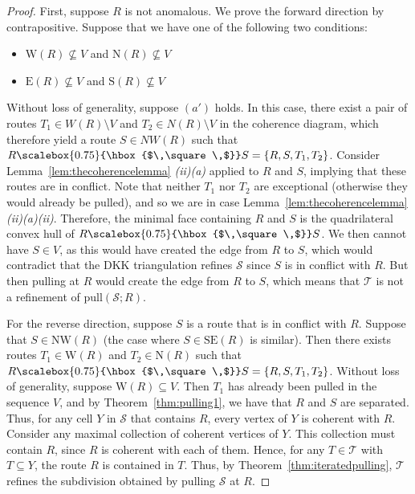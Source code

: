 \documentclass[12pt]{amsart}
\theoremstyle{definition}
\newcommand\calS{\mathcal{S}}
\newcommand\calT{\mathcal{T}}
\newcommand\pull{\mathrm{pull}}
\newcommand\north{\mathrm{N}}
\newcommand\south{\mathrm{S}}
\newcommand\east{\mathrm{E}}
\newcommand\west{\mathrm{W}}
\newcommand\NW{\mathrm{NW}}
\newcommand\SE{\mathrm{SE}}
\newcommand\squarette{\scalebox{0.75}{\hbox{$\,\square\,$}}}
\begin{document}
\begin{proof}
    First, suppose $R$ is not anomalous.
    We prove the forward direction by contrapositive.
    Suppose that we have one of the following two conditions:
    \begin{itemize}
         \item[$a')$] $\west(R)\nsubseteq V$ and $\north(R)\nsubseteq V$
         \item[$b')$] $\east(R)\nsubseteq V$ and $\south(R)\nsubseteq V$
     \end{itemize}
     Without loss of generality, suppose $(a')$ holds.
     In this case, there exist a pair of routes $T_1\in W(R)\setminus V$ and $T_2\in N(R) \setminus V$ in the coherence diagram, which therefore yield a route $S\in NW(R)$ such that $R\squarette S=\{R,S,T_1,T_2\}$.
     Consider Lemma~\ref{lem:thecoherencelemma} \textit{(ii)(a)} applied to $R$ and $S$, implying that these routes are in conflict. Note that neither $T_1$ nor $T_2$ are exceptional (otherwise they would already be pulled), and so we are in case Lemma~\ref{lem:thecoherencelemma} \textit{(ii)(a)(ii)}. Therefore, the minimal face containing $R$ and $S$ is the quadrilateral convex hull of $R\squarette S$. We then cannot have $S\in V$, as this would have created the edge from $R$ to $S$, which would contradict that the DKK triangulation refines $\calS$ since $S$ is in conflict with $R$.
     But then pulling at $R$ would create the edge from $R$ to $S$, which means that $\calT$ is not a refinement of $\pull(\calS;R)$.

     For the reverse direction, suppose $S$ is a route that is in conflict with $R$.
     Suppose that $S\in \NW(R)$ (the case where $S\in \SE(R)$ is similar).
     Then there exists routes $T_1\in \west(R)$ and $T_2\in \north(R)$ such that $R\squarette S=\{R,S,T_1,T_2\}$.
     Without loss of generality, suppose $\west(R)\subseteq V$.
     Then $T_1$ has already been pulled in the sequence $V$, and by Theorem~\ref{thm:pulling1}, we have that $R$ and $S$ are separated.
     Thus, for any cell $Y$ in $\calS$ that contains $R$, every vertex of $Y$ is coherent with $R$. 
     Consider any maximal collection of coherent vertices of $Y$.
     This collection must contain $R$, since $R$ is coherent with each of them. 
     Hence, for any $T\in \calT$ with $T\subseteq Y$, the route $R$ is contained in $T$. 
     Thus, by Theorem~\ref{thm:iteratedpulling}, $\calT$ refines the subdivision obtained by pulling $\calS$ at $R$.


\end{proof}
\end{document}
